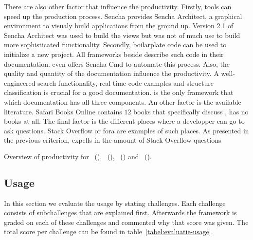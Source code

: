 \documentclass[a4paper]{artikel3}
\begin{document}
There are also other factor that influence the productivity.
Firstly,  tools can speed up the production process.
Sencha provides Sencha Architect,  a graphical environment to visualy build applications from the ground up.
Version 2.1 of Sencha Architect was used to build the views but was not of much use to build more sophisticated functionality.
Secondly,  boilarplate code can be used to initialize a new project.
All frameworks beside \lungo{} describe such code in their documentation.
\st{} even offers Sencha Cmd to automate this process.
Also, the quality and quantity of the documentation influence the productivity.
A well-engineered search functionality,  real-time code examples and structure classification is crucial for a good documentation.
\kendo{} is the only framework that which documentation has all three components.  
An other factor is the available literature.
Safari Books Online contains $12$ books that specifically discuss \jqm{},  \lungo{} has no books at all.
The final factor is the different places where a developper can go to ask questions.
Stack Overflow or fora are examples of such places. %
As presented in the previous criterion,  \jqm{} expells in the amount of Stack Overflow questions


\begin{table}
\centering
{}
\caption{Overview of productivity for \st{}~(\sta), \kendo{}~(\kendoa), \jqm{}~(\jqma) and \lungo{}~(\lungoa).}
\label{tabel:evaluatie-productiviteit}
\end{table}


\subsection{Usage}
\label{sec:evaluation-usage}
In this section we evaluate the usage by stating challenges.
Each challenge consists of subchallenges that are explained first.
Afterwards the framework is graded on each of these challenges and commented why that score was given.
The total score per challenge can be found in table~\ref{tabel:evaluatie-usage}.
\end{document}

